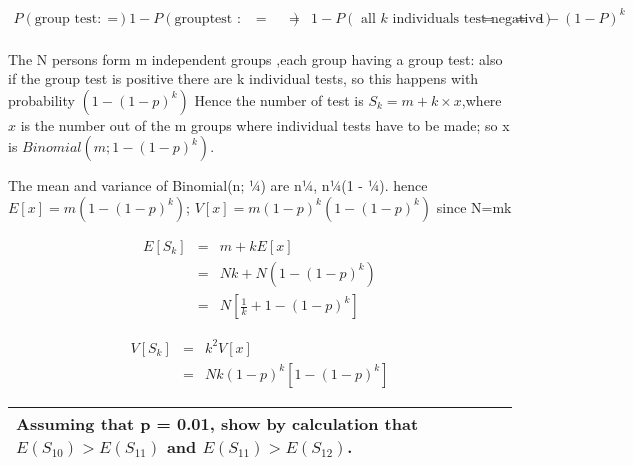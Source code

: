 \documentclass[a4paper,12pt]{article}
\begin{document}
\item 

\begin{eqnarray*}
P(\mbox{group test: Positive}) &=& 1 - P(\mbox{grouptest : negative})&=&
&=& 1 - P(\mbox{ all }k \mbox{ individuals test negative})&=&
&=& 1 - (1 - P)^k\\
\end{eqnarray*}

\item The N persons form m independent groups ,each group having a group test: also
if the group test is positive there are k individual tests, so this happens with probability
$(1 - (1 - p)^k)$
Hence the number of test is $S_{k} = m + k \times x$,where $x$ is the number out of the m
groups where individual tests have to be made; so x is $Binomial(m; 1 - (1 - p)^k)$.

\item The mean and variance of Binomial(n; ¼) are n¼, n¼(1 - ¼). hence
$E[x] = m(1 - (1 - p)^{k})$; 
$V [x] = m(1 - p)^{k}(1 - (1 - p)^{k})
$
since N=mk

\begin{eqnarray*}
E[S_{k}] &=& m + kE[x] \\&=& N
k + N(1 - (1 - p)^{k}) 
\\&=& N[ \frac{1}{
k} + 1 - (1 - p)^{k}]
\end{eqnarray*}

\begin{eqnarray*}
V [S_{k}] &=& k^2V [x] \\&=& Nk(1 - p)^{k}[1 - (1 - p)^{k}]
\end{eqnarray*}

  \begin{table}[ht!]
     \centering
     \begin{tabular}{|p{15cm}|}
     \hline   Assuming that p = 0.01, show by calculation that $E(S_{10}) > E(S_{11})$ and $E(S_{11}) > E(S_{12})$.
\\ \hline
      \end{tabular}
    \end{table}
    
\end{document}

